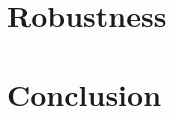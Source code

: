 \documentclass[12pt]{article}
\begin{document}
\section{Robustness}

\section{Conclusion}



\end{document}
